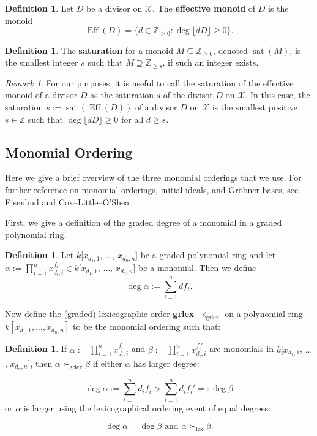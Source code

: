 \documentclass{amsart}
\theoremstyle{plain}
\theoremstyle{definition}
\newtheorem{defn}[thm]{Definition}
\theoremstyle{remark}
\newtheorem{rem}[thm]{Remark}
\numberwithin{equation}{section}
\newcommand\ssec{\subsection}
\newcommand\BZ{{\mathbb Z}}
\newcommand \sx{\mathscr X}
\DeclareMathOperator{\Eff}{Eff}
\DeclareMathOperator{\sat}{sat}
\begin{document}
\begin{defn}
Let $D$ be a divisor on $\sx$. The \textbf{effective monoid} of $D$
is the monoid
\[
	\Eff(D) = \{d \in \BZ_{\geq 0} : \deg \lfloor dD \rfloor \geq 0 \}.
\]
\end{defn}

\begin{defn}
\label{defn:sat}
The \textbf{saturation} for a monoid $M \subseteq \BZ_{\geq 0}$,
denoted $\sat(M)$, is the smallest integer $s$ such that $M
\supseteq \BZ_{\geq s}$, if such an integer exists.
\end{defn}

\begin{rem}
For our purposes, it is useful to call the saturation of the
effective monoid of a divisor $D$ as the saturation $s$ of the
divisor $D$ on $\sx$. In this case, the saturation $s :=
\sat(\Eff(D))$ of a divisor $D$ on $\sx$ is the smallest positive
$s \in \BZ$ such that $\deg \lfloor dD \rfloor \geq 0$ for all $d
\geq s$.
\end{rem}

\ssec{Monomial Ordering}
\label{ssec:monomial-order}
Here we give a brief overview of the three monomial orderings
that we use. For further reference on monomial orderings,
initial ideals, and Gr\"{o}bner bases, see Eisenbud
\cite[Section 15.9]{eisenbud:comm-alg} and Cox--Little--O'Shea
\cite[Chapter 2]{cls:ideals-varieties-algorithms}.

First, we give a definition of the graded degree of a monomial
in a graded polynomial ring.

\begin{defn}
\label{defn:monomial-degree}
Let $k[x_{d_1, 1}$, $\ldots$, $x_{d_n, n}]$ be a graded polynomial
ring and let $\alpha := \prod_{i = 1}^{n} x_{d_i, i}^{f_i} \in
k[x_{d_1, 1}$, $\ldots$, $x_{d_n, n}]$ be a monomial. Then
we define
\[
	\deg \alpha := \sum_{i = 1}^{n} d f_i.
\]
\end{defn}
 
Now define the (graded) lexicographic order \textbf{grlex}
$\prec_{\text{grlex}}$ on a polynomial ring $k[x_{d_1, 1}, \ldots,
x_{d_n, n}]$ to be the monomial ordering such that:

\begin{defn}
\label{defn:grlex}
If $\alpha := \prod_{i = 1}^{n} x_{d_i, i}
^{f_i}$ and $\beta := \prod_{i = 1}^{n} x_{d_i, i}^{f_i'}$ are
monomials in $k[x_{d_1, 1}$, $\ldots$, $x_{d_n, n}]$, then $\alpha
\succ_{\text{grlex}} \beta$ if either $\alpha$ has larger degree:

\begin{equation}
	\deg \alpha := \sum_{i = 1}^{n} d_i f_i  > \sum_{i = 1}^{n} d_i f_i' =: \deg \beta
\end{equation}
or $\alpha$ is larger using the lexicographical ordering event of equal
degrees:

\begin{equation}
\label{eqn:grlex-tie}
	\deg \alpha = \deg \beta \text{ and }
	\alpha \succ_{\text{lex}} \beta.
\end{equation}
\end{defn}
\end{document}
